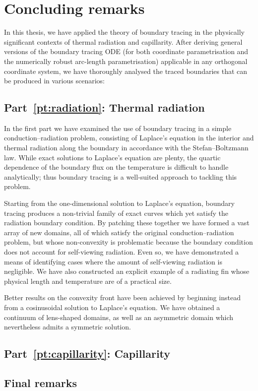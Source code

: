 \chapter{Concluding remarks}
\label{ch:concluding}

In this thesis,
we have applied the theory of boundary tracing
in the physically significant contexts
of thermal radiation and capillarity.
After deriving general versions of the boundary tracing ODE
(for both coordinate parametrisation
and the numerically robust arc-length parametrisation)
applicable in any orthogonal coordinate system,
we have thoroughly analysed
the traced boundaries that can be produced in various scenarios:

\section{Part~\ref*{pt:radiation}: Thermal radiation}
\label{sec:concluding.radiation}

In the first part we have examined the use of boundary tracing
in a simple conduction--radiation problem,
consisting of Laplace's equation in the interior
and thermal radiation along the boundary
in accordance with the Stefan--Boltzmann law.
While exact solutions to Laplace's equation are plenty,
the quartic dependence of the boundary flux on the temperature
is difficult to handle analytically;
thus boundary tracing is a well-suited approach to tackling this problem.

Starting from the one-dimensional solution to Laplace's equation,
boundary tracing produces a non-trivial family of exact curves
which yet satisfy the radiation boundary condition.
By patching these together
we have formed a vast array of new domains,
all of which satisfy the original conduction--radiation problem,
but whose non-convexity is problematic
because the boundary condition does not account for self-viewing radiation.
Even so, we have demonstrated a means of identifying cases
where the amount of self-viewing radiation is negligible.
We have also constructed an explicit example of a radiating fin
whose physical length and temperature are of a practical size.

Better results on the convexity front have been achieved
by beginning instead from a cosinusoidal solution to Laplace's equation.
We have obtained a continuum of lens-shaped domains,
as well as an asymmetric domain
which nevertheless admits a symmetric solution.


\section{Part~\ref*{pt:capillarity}: Capillarity}
\label{sec:concluding.capillarity}

\section{Final remarks}
\label{sec:concluding.final}

